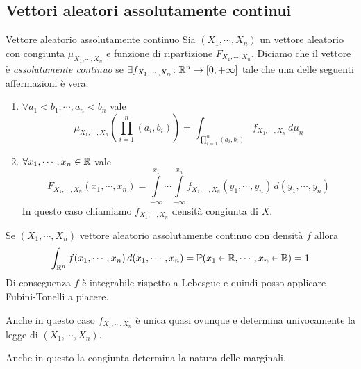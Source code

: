 \documentclass[a4paper]{article}
\begin{document}
\subsection{Vettori aleatori assolutamente continui}

\begin{snippetdefinition}{Vettore aleatorio assolutamente continuo}
    Sia \((X_1, \cdots, X_n)\)
    un vettore aleatorio con congiunta
    \(\mu_{X_1, \cdots, X_n}\) e funzione di ripartizione
    \(F_{X_1, \cdots, X_n}\).
    Diciamo che il vettore è \emph{assolutamente continuo}
    se \(\exists f_{X_1, \cdots, X_n} \colon \mathbb{R}^n \to [0,+\infty]\)
    tale che una delle seguenti affermazioni è vera:
    \begin{enumerate}
        \item \(\forall a_1 < b_1, \cdots, a_n < b_n\) vale
            \[
                \mu_{X_1, \cdots, X_n}
                \left(
                    \prod_{i=1}^n (a_i, b_i)
                \right)
                = \int_{
                    \prod_{i=1}^n (a_i, b_i)
                }
                f_{X_1, \cdots, X_n}\,d\mu_n
            \]
        \item \(\forall x_1, \cdots, x_n \in \mathbb{R}\) vale
            \[
                F_{X_1, \cdots, X_n}
                (x_1, \cdots, x_n)
                = \int\limits_{-\infty}^{x_1}
                \cdots
                \int\limits_{-\infty}^{x_n}
                f_{X_1, \cdots, X_n}(y_1, \cdots, y_n)\,d(y_1, \cdots, y_n)
            \]
            In questo caso chiamiamo \(f_{X_1, \cdots, X_n}\)
            densità congiunta di \(X\).
    \end{enumerate}
\end{snippetdefinition}

Se \((X_1, \cdots, X_n)\) vettore aleatorio assolutamente continuo con densità
\(f\) allora \[
    \int_{\mathbb{R}^n} f(x_1, \cdots, x_n)\,d(x_1, \cdots, x_n)
    = \mathbb P(x_1 \in \mathbb{R}, \cdots, x_n \in \mathbb{R}) = 1
\]
Di conseguenza \(f\) è integrabile rispetto a Lebesgue e quindi posso applicare Fubini-Tonelli
a piacere.

Anche in questo caso \(f_{X_1, \cdots, X_n}\) è unica
quasi ovunque e determina univocamente la legge di \((X_1, \cdots, X_n)\).

Anche in questo la congiunta determina la natura delle marginali.
\end{document}
